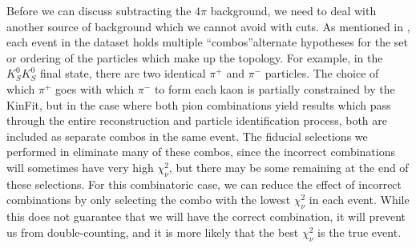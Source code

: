 Before we can discuss subtracting the $4\pi$ background, we need to deal with another source of background which we cannot avoid with cuts. As mentioned in , each event in the dataset holds multiple ``combos''\textemdash alternate hypotheses for the set or ordering of the particles which make up the topology. For example, in the $K_S^0K_S^0$ final state, there are two identical $\pi^+$ and $\pi^-$ particles. The choice of which $\pi^+$ goes with which $\pi^-$ to form each kaon is partially constrained by the KinFit, but in the case where both pion combinations yield results which pass through the entire reconstruction and particle identification process, both are included as separate combos in the same event. The fiducial selections we performed in  eliminate many of these combos, since the incorrect combinations will sometimes have very high $\chi^2_\nu$, but there may be some remaining at the end of these selections. For this combinatoric case, we can reduce the effect of incorrect combinations by only selecting the combo with the lowest $\chi^2_\nu$ in each event. While this does not guarantee that we will have the correct combination, it will prevent us from double-counting, and it is more likely that the best $\chi^2_\nu$ is the true event.

